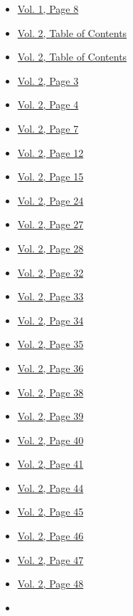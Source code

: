 \begin{itemize}
  \begin{itemize}
  \tightlist
  \item
    \protect\hyperlink{g-page-16}{Vol. 1, Page 8}
  \item
    \protect\hyperlink{g-page-209}{Vol. 2, Table of Contents}
  \item
    \protect\hyperlink{g-page-210}{Vol. 2, Table of Contents}
  \item
    \protect\hyperlink{g-page-215}{Vol. 2, Page 3}
  \item
    \protect\hyperlink{g-page-216}{Vol. 2, Page 4}
  \item
    \protect\hyperlink{g-page-219}{Vol. 2, Page 7}
  \item
    \protect\hyperlink{g-page-224}{Vol. 2, Page 12}
  \item
    \protect\hyperlink{g-page-227}{Vol. 2, Page 15}
  \item
    \protect\hyperlink{g-page-236}{Vol. 2, Page 24}
  \item
    \protect\hyperlink{g-page-239}{Vol. 2, Page 27}
  \item
    \protect\hyperlink{g-page-240}{Vol. 2, Page 28}
  \item
    \protect\hyperlink{g-page-244}{Vol. 2, Page 32}
  \item
    \protect\hyperlink{g-page-245}{Vol. 2, Page 33}
  \item
    \protect\hyperlink{g-page-246}{Vol. 2, Page 34}
  \item
    \protect\hyperlink{g-page-247}{Vol. 2, Page 35}
  \item
    \protect\hyperlink{g-page-248}{Vol. 2, Page 36}
  \item
    \protect\hyperlink{g-page-250}{Vol. 2, Page 38}
  \item
    \protect\hyperlink{g-page-251}{Vol. 2, Page 39}
  \item
    \protect\hyperlink{g-page-252}{Vol. 2, Page 40}
  \item
    \protect\hyperlink{g-page-253}{Vol. 2, Page 41}
  \item
    \protect\hyperlink{g-page-256}{Vol. 2, Page 44}
  \item
    \protect\hyperlink{g-page-257}{Vol. 2, Page 45}
  \item
    \protect\hyperlink{g-page-258}{Vol. 2, Page 46}
  \item
    \protect\hyperlink{g-page-259}{Vol. 2, Page 47}
  \item
    \protect\hyperlink{g-page-260}{Vol. 2, Page 48}
  \item

\end{itemize}
\end{itemize}
